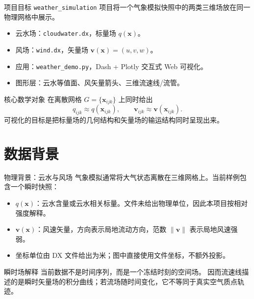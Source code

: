 \documentclass[aspectratio=169,11pt]{ctexbeamer}
\newcommand{\vx}{\mathbf x}
\newcommand{\vv}{\mathbf v}
\begin{document}
\begin{frame}{项目目标}
  \texttt{weather\_simulation} 项目将一个气象模拟快照中的两类三维场放在同一物理网格中展示。

  \begin{itemize}
    \item 云水场：\texttt{cloudwater.dx}，标量场 $q(\vx)$。
    \item 风场：\texttt{wind.dx}，矢量场 $\vv(\vx)=(u,v,w)$。
    \item 应用：\texttt{weather\_demo.py}，Dash + Plotly 交互式 Web 可视化。
    \item 图形层：云水等值面、风矢量箭头、三维流速线/流管。
  \end{itemize}

  \begin{block}{核心数学对象}
    在离散网格 $G=\{\vx_{ijk}\}$ 上同时给出
    \[
      q_{ijk}\approx q(\vx_{ijk}),\qquad
      \vv_{ijk}\approx \vv(\vx_{ijk}) .
    \]
    可视化的目标是把标量场的几何结构和矢量场的输运结构同时呈现出来。
  \end{block}
\end{frame}

\section{数据背景}

\begin{frame}{物理背景：云水与风场}
  \small
  气象模拟通常将大气状态离散在三维网格上。当前样例包含一个瞬时快照：

  \begin{itemize}
    \item $q(\vx)$：云水含量或云水相关标量。文件未给出物理单位，因此本项目按相对强度解释。
    \item $\vv(\vx)$：风速矢量，方向表示局地流动方向，范数 $\|\vv\|$ 表示局地风速强弱。
    \item 坐标单位由 DX 文件给出为米；图中直接使用文件坐标，不额外投影。
  \end{itemize}

  \begin{block}{瞬时场解释}
    当前数据不是时间序列，而是一个冻结时刻的空间场。
    因而流速线描述的是瞬时矢量场的积分曲线；若流场随时间变化，它不等同于真实空气质点轨迹。
  \end{block}
\end{frame}
\end{document}
